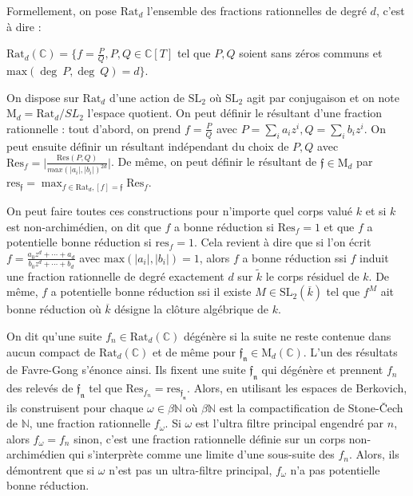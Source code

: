 \documentclass[11pt]{article}
\newcommand{\N}{\mathbb{N}}
\newcommand{\C}{\mathbb{C}}
\newcommand{\Rat}{\mathrm{Rat}}
\newcommand{\Res}{\mathrm{Res}}
\newcommand{\SL}{\mathrm{SL}}
\newcommand{\res}{\mathrm{res}}
\newcommand{\M}{\mathrm{M}}
\begin{document}
Formellement, on pose $\Rat_d$ l'ensemble des fractions rationnelles de degré $d$, c'est à dire :

\begin{center}
$\mathrm{Rat}_d(\C) = \lbrace f= \frac{P}{Q}, P,Q\in \C[T]$ tel que $P,Q$ soient sans zéros communs et $\mathrm{max}(\deg~P, \deg~Q) = d\rbrace$.
\end{center} 
On dispose sur $\Rat_d$ d'une action de $\SL_2$ où $\SL_2$ agit par conjugaison et on note $\M_d =  \Rat_d/SL_2$ l'espace quotient. On peut définir le résultant d'une fraction rationnelle : tout d'abord, on prend $f = \frac{P}{Q}$ avec $P = \sum_i a_i z^i, Q = \sum_i b_i z^i$. On peut ensuite définir un résultant indépendant du choix de $P,Q$ avec $\mathrm{Res}_f = \vert \frac{\Res(P,Q)}{max (|a_i|, |b_i|)^{2d}}\vert$. De même, on peut définir le résultant de $\mathfrak{f} \in \M_d$ par $\res_\mathfrak{f} = \max_{f\in \mathrm{Rat}_d, [f] = \mathfrak{f}} \mathrm{Res}_f$.

On peut faire toutes ces constructions pour n'importe quel corps valué $k$ et si $k$ est non-archimédien, on dit que $f$ a bonne réduction si $\mathrm{Res}_f = 1$ et que $f$ a potentielle bonne réduction si $\res_f = 1$. Cela revient à dire que si l'on écrit $f = \frac{a_0z^d + \cdots + a_d}{b_0z^d + \cdots + b_d}$ avec $\mathrm{max}(|a_i|, |b_i|) =1$, alors $f$ a bonne réduction ssi $f$ induit une fraction rationnelle de degré exactement $d$ sur $\tilde{k}$ le corps résiduel de $k$. De même, $f$ a potentielle bonne réduction ssi il existe $M \in \SL_2(\overline{k})$ tel que $f^M$ ait bonne réduction où $\overline{k}$ désigne la clôture algébrique de $k$.

On dit qu'une suite $f_n \in \Rat_d(\C)$ dégénère si la suite ne reste contenue dans aucun compact de $\Rat_d(\C)$ et de même pour $\mathfrak{f_n} \in \M_d(\C)$. L'un des résultats de Favre-Gong s'énonce ainsi. Ils fixent une suite $\mathfrak{f_n}$ qui dégénère et prennent $f_n$ des relevés de $\mathfrak{f_n}$ tel que $\Res_{f_n} = \res_\mathfrak{f_n}$. Alors, en utilisant les espaces de Berkovich, ils construisent pour chaque $\omega \in \beta \N$ où $\beta \N$ est la compactification de Stone-Čech de $\N$, une fraction rationnelle $f_\omega$. Si $\omega$ est l'ultra filtre principal engendré par $n$, alors $f_\omega = f_n$ sinon, c'est une fraction rationnelle définie sur un corps non-archimédien qui s'interprète comme une limite d'une sous-suite des $f_n$. Alors, ils démontrent que si $\omega$ n'est pas un ultra-filtre principal, $f_\omega$ n'a pas potentielle bonne réduction. 
\end{document}
